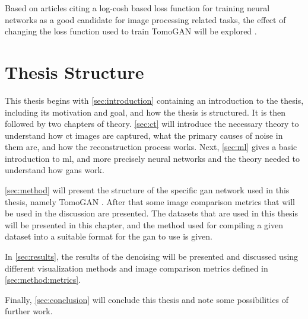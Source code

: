 Based on articles citing a log-cosh based loss function for training neural networks as a good candidate for image processing related tasks, the effect of changing the loss function used to train TomoGAN will be explored \cite{chen2019log,7797130}. 

\section{Thesis Structure}
This thesis begins with \cref{sec:introduction} containing an introduction to the thesis, including its motivation and goal, and how the thesis is structured. It is then followed by two chapters of theory. \cref{sec:ct} will introduce the necessary theory to understand how \gls{ct} images are captured, what the primary causes of noise in them are, and how the reconstruction process works. Next, \cref{sec:ml} gives a basic introduction to \gls{ml}, and more precisely neural networks and the theory needed to understand how \gls{gan}s work. 

\cref{sec:method} will present the structure of the specific \gls{gan} network used in this thesis, namely TomoGAN \cite{liu2020tomogan}. After that some image comparison metrics that will be used in the discussion are presented. The datasets that are used in this thesis will be presented in this chapter, and the method used for compiling a given dataset into a suitable format for the \gls{gan} to use is given. 

In \cref{sec:results}, the results of the denoising will be presented and discussed using different visualization methods and image comparison metrics defined in \cref{sec:method:metrics}.

Finally, \cref{sec:conclusion} will conclude this thesis and note some possibilities of further work. 